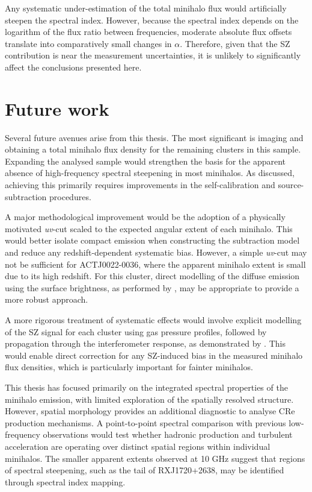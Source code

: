 Any systematic under-estimation of the total minihalo flux would artificially steepen the spectral index. However, because the spectral index depends on the logarithm of the flux ratio between frequencies, moderate absolute flux offsets translate into comparatively small changes in $\alpha$. Therefore, given that the SZ contribution is near the measurement uncertainties, it is unlikely to significantly affect the conclusions presented here. 

\section{Future work}
Several future avenues arise from this thesis. The most significant is imaging and obtaining a total minihalo flux density for the remaining clusters in this sample. Expanding the analysed sample would strengthen the basis for the apparent absence of high-frequency spectral steepening in most minihalos. As discussed, achieving this primarily requires improvements in the self-calibration and source-subtraction procedures. 

A major methodological improvement would be the adoption of a physically motivated \textit{uv}-cut scaled to the expected angular extent of each minihalo. This would better isolate compact emission when constructing the subtraction model and reduce any redshift-dependent systematic bias. However, a simple \textit{uv}-cut may not be sufficient for ACTJ0022-0036, where the apparent minihalo extent is small due to its high redshift. For this cluster, direct modelling of the diffuse emission using the surface brightness, as performed by \citet{Knowles2019}, may be appropriate to provide a more robust approach. 

A more rigorous treatment of systematic effects would involve explicit modelling of the SZ signal for each cluster using gas pressure profiles, followed by propagation through the interferometer response, as demonstrated by \citet{Perrott2021}. This would enable direct correction for any SZ-induced bias in the measured minihalo flux densities, which is particularly important for fainter minihalos.

This thesis has focused primarily on the integrated spectral properties of the minihalo emission, with limited exploration of the spatially resolved structure. However, spatial morphology provides an additional diagnostic to analyse CRe production mechanisms. A point-to-point spectral comparison with previous low-frequency observations would test whether hadronic production and turbulent acceleration are operating over distinct spatial regions within individual minihalos. The smaller apparent extents observed at 10 GHz suggest that regions of spectral steepening, such as the tail of RXJ1720+2638, may be identified through spectral index mapping. 

